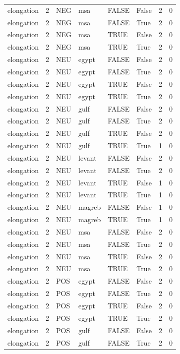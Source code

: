\begin{tabular}{llllllrr}
elongation & 2 & NEG & msa & FALSE & False & 2 & 0 \\
elongation & 2 & NEG & msa & FALSE & True & 2 & 0 \\
elongation & 2 & NEG & msa & TRUE & False & 2 & 0 \\
elongation & 2 & NEG & msa & TRUE & True & 2 & 0 \\
elongation & 2 & NEU & egypt & FALSE & False & 2 & 0 \\
elongation & 2 & NEU & egypt & FALSE & True & 2 & 0 \\
elongation & 2 & NEU & egypt & TRUE & False & 2 & 0 \\
elongation & 2 & NEU & egypt & TRUE & True & 2 & 0 \\
elongation & 2 & NEU & gulf & FALSE & False & 2 & 0 \\
elongation & 2 & NEU & gulf & FALSE & True & 2 & 0 \\
elongation & 2 & NEU & gulf & TRUE & False & 2 & 0 \\
elongation & 2 & NEU & gulf & TRUE & True & 1 & 0 \\
elongation & 2 & NEU & levant & FALSE & False & 2 & 0 \\
elongation & 2 & NEU & levant & FALSE & True & 2 & 0 \\
elongation & 2 & NEU & levant & TRUE & False & 1 & 0 \\
elongation & 2 & NEU & levant & TRUE & True & 1 & 0 \\
elongation & 2 & NEU & magreb & FALSE & False & 1 & 0 \\
elongation & 2 & NEU & magreb & TRUE & True & 1 & 0 \\
elongation & 2 & NEU & msa & FALSE & False & 2 & 0 \\
elongation & 2 & NEU & msa & FALSE & True & 2 & 0 \\
elongation & 2 & NEU & msa & TRUE & False & 2 & 0 \\
elongation & 2 & NEU & msa & TRUE & True & 2 & 0 \\
elongation & 2 & POS & egypt & FALSE & False & 2 & 0 \\
elongation & 2 & POS & egypt & FALSE & True & 2 & 0 \\
elongation & 2 & POS & egypt & TRUE & False & 2 & 0 \\
elongation & 2 & POS & egypt & TRUE & True & 2 & 0 \\
elongation & 2 & POS & gulf & FALSE & False & 2 & 0 \\
elongation & 2 & POS & gulf & FALSE & True & 2 & 0 \\

\end{tabular}

